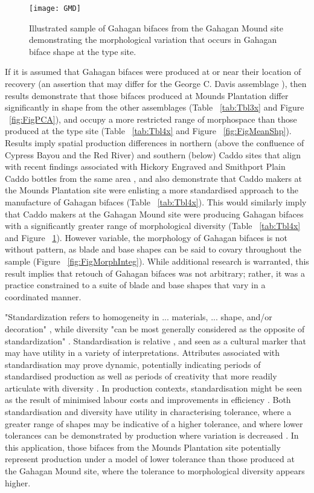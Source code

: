 \documentclass[review]{elsarticle}
\begin{document}
\begin{figure}[ht]\centering
\texttt{[image: GMD]}
\caption{Illustrated sample of Gahagan bifaces from the Gahagan Mound site demonstrating the morphological variation that occurs in Gahagan biface shape at the type site.}
\label{fig:GMD}
\end{figure}

If it is assumed that Gahagan bifaces were produced at or near their location of recovery (an assertion that may differ for the George C. Davis assemblage \citep{RN3682}), then results demonstrate that those bifaces produced at Mounds Plantation differ significantly in shape from the other assemblages (Table ~\ref{tab:Tbl3x} and Figure ~\ref{fig:FigPCA}), and occupy a more restricted range of morphospace than those produced at the type site (Table ~\ref{tab:Tbl4x} and Figure ~\ref{fig:FigMeanShp}). Results imply spatial production differences in northern (above the confluence of Cypress Bayou and the Red River) and southern (below) Caddo sites that align with recent findings associated with Hickory Engraved and Smithport Plain Caddo bottles from the same area \citep{RN11801,RN11716}, and also demonstrate that Caddo makers at the Mounds Plantation site were enlisting a more standardised approach to the manufacture of Gahagan bifaces (Table ~\ref{tab:Tbl4x}). This would similarly imply that Caddo makers at the Gahagan Mound site were producing Gahagan bifaces with a significantly greater range of morphological diversity (Table ~\ref{tab:Tbl4x} and Figure ~\ref{fig:GMD}). However variable, the morphology of Gahagan bifaces is not without pattern, as blade and base shapes can be said to covary throughout the sample (Figure ~\ref{fig:FigMorphInteg}). While additional research is warranted, this result implies that retouch of Gahagan bifaces was not arbitrary; rather, it was a practice constrained to a suite of blade and base shapes that vary in a coordinated manner.

"Standardization refers to homogeneity in ... materials, ... shape, and/or decoration" \citep[622]{RN28}, while diversity "can be most generally considered as the opposite of standardization" \citep[273]{RN18}. Standardisation is relative \citep{RN387,RN13}, and seen as a cultural marker that may have utility in a variety of interpretations. Attributes associated with standardisation may prove dynamic, potentially indicating periods of standardised production as well as periods of creativity that more readily articulate with diversity \citep{RN7}. In production contexts, standardisation might be seen as the result of minimised labour costs and improvements in efficiency \citep{RN13}. Both standardisation and diversity have utility in characterising tolerance, where a greater range of shapes may be indicative of a higher tolerance, and where lower tolerances can be demonstrated by production where variation is decreased \citep{RN35}. In this application, those bifaces from the Mounds Plantation site potentially represent production under a model of lower tolerance than those produced at the Gahagan Mound site, where the tolerance to morphological diversity appears higher.
\end{document}
